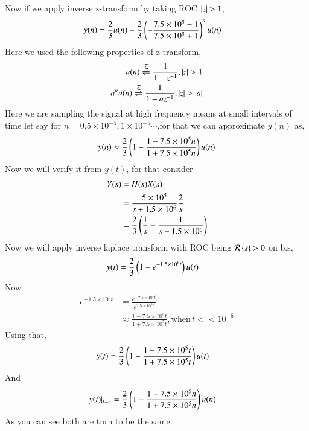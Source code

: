 \documentclass[journal,12pt,twocolumn]{IEEEtran}
\renewcommand\thesection{\arabic{section}}
\begin{document}
\begin{enumerate}[label=\arabic*.,ref=\thesection.\theenumi]
	 Now if we apply inverse z-transform by taking ROC $\left\vert z\right\vert > 1$,
	  \begin{align}
		  y(n) &= \frac{2}{3}u(n) - \frac{2}{3}\left(-\frac{7.5 \times 10^5 -1}{7.5 \times 10^5 + 1}\right)^nu(n)
	  \end{align}
	  Here we used the following properties of z-transform,
	   \begin{align}
		   u(n) \overset{\mathcal{Z}}{ \rightleftharpoons} \frac{1}{1-z^{-1}} , \left\vert z\right\vert > 1\\
		   a^{n}u(n) \overset{\mathcal{Z}}{ \rightleftharpoons} \frac{1}{1 - az^{-1}} ,\left\vert z\right\vert >\left\vert a\right\vert
	   \end{align}
	   Here we are sampling the signal at high frequency means at small intervals of time let say for $n = 0.5 \times 10^{-5} , 1 \times 10^{-5} \cdots$,for that we can approximate $y(n)$ as,
	    \begin{align}
		    y(n) \approx \frac{2}{3}\left( 1 - \frac{1 - 7.5 \times 10^5n}{1 + 7.5\times 10^5n}\right)u(n)
	    \end{align}
            Now we will verify it from $y(t)$, for that consider
	     \begin{align}
		     Y(s) &= H(s)X(s) \\
			  &=\frac{5 \times 10^5}{s + 1.5 \times 10^6}\frac{2}{s} \\
			  &= \frac{2}{3}\left(\frac{1}{s} - \frac{1}{s + 1.5 \times 10^6}\right)
	     \end{align}
	     Now we will apply inverse laplace transform with ROC being $\mathcal{R}\left\{s\right\} > 0$ on b.s,
	      \begin{align}
	           y(t) &= \frac{2}{3}\left(1 - e^{-1.5\times 10^6t}\right)u(t)
              \end{align}
               Now 
	        \begin{align}
			e^{-1.5 \times 10^6t} &= \frac{e^{-7.5 \times 10^5t}}{e^{7.5 \times 10^5t}} \\
			&\approx \frac{1 - 7.5\times10^5t}{1 + 7.5\times10^5t} , \text{when}\, t << 10^{-6}
		\end{align}
	Using that,
	     \begin{align}
		     y(t) &= \frac{2}{3}\left(1 - \frac{1 - 7.5\times10^5t}{1 + 7.5\times10^5t}\right)u(t)
	     \end{align}
	     And 
	      \begin{align}
		      y(t)\vert_{t = n} &= \frac{2}{3}\left(1 - \frac{1 - 7.5\times10^5n}{1 + 7.5\times10^5n}\right)u(n)
              \end{align}
          As you can see both are turn to be the same.\\

\end{enumerate}
\end{document}
